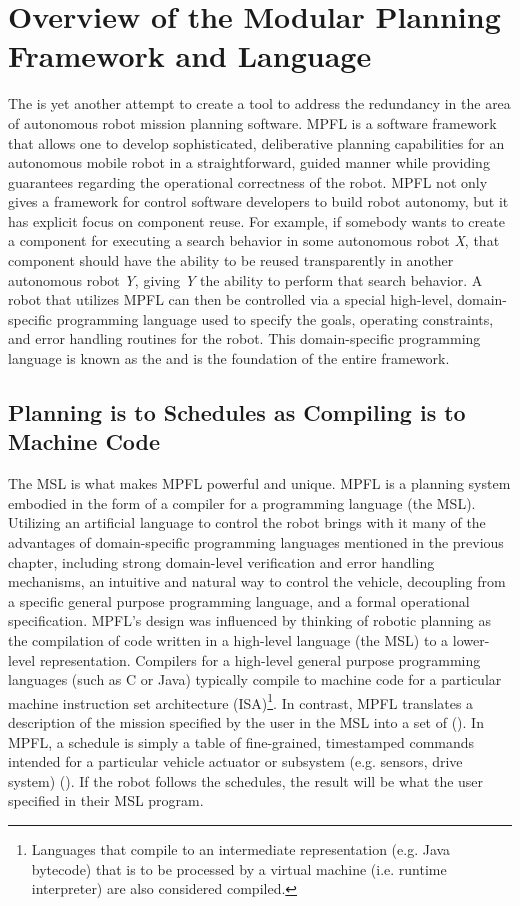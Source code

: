\section{Overview of the Modular Planning Framework and Language}
The  is yet another attempt to create a tool to address the redundancy in the area of autonomous robot mission planning software. MPFL is a software framework that allows one to develop sophisticated, deliberative planning capabilities for an autonomous mobile robot in a straightforward, guided manner while providing guarantees regarding the operational correctness of the robot. MPFL not only gives a framework for control software developers to build robot autonomy, but it has explicit focus on component reuse. For example, if somebody wants to create a component for executing a search behavior in some autonomous robot \textit{X}, that component should have the ability to be reused transparently in another autonomous robot \textit{Y}, giving \textit{Y} the ability to perform that search behavior. A robot that utilizes MPFL can then be controlled via a special high-level, domain-specific programming language used to specify the goals, operating constraints, and error handling routines for the robot. This domain-specific programming language is known as the  and is the foundation of the entire framework.

\subsection{Planning is to Schedules as Compiling is to Machine Code}
The MSL is what makes MPFL powerful and unique. MPFL is a planning system embodied in the form of a compiler for a programming language (the MSL). Utilizing an artificial language to control the robot brings with it many of the advantages of domain-specific programming languages mentioned in the previous chapter, including strong domain-level verification and error handling mechanisms, an intuitive and natural way to control the vehicle, decoupling from a specific general purpose programming language, and a formal operational specification. MPFL's design was influenced by thinking of robotic planning as the compilation of code written in a high-level language (the MSL) to a lower-level representation. Compilers for a high-level general purpose programming languages (such as C or Java) typically compile to machine code for a particular machine instruction set architecture (ISA)\footnote{Languages that compile to an intermediate representation (e.g. Java bytecode) that is to be processed by a virtual machine (i.e. runtime interpreter) are also considered compiled.}. In contrast, MPFL translates a description of the mission specified by the user in the MSL into a set of  (). In MPFL, a schedule is simply a table of fine-grained, timestamped commands intended for a particular vehicle actuator or subsystem (e.g. sensors, drive system) (). If the robot follows the schedules, the result will be what the user specified in their MSL program.

